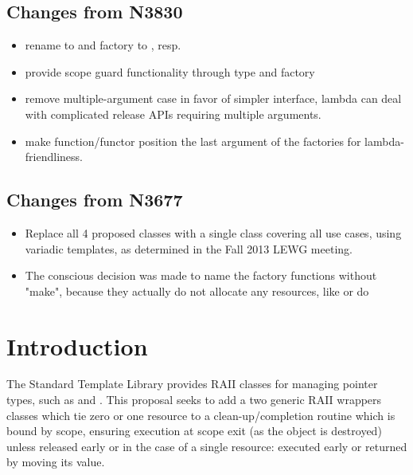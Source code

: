 \documentclass[ebook,11pt,article]{memoir}
\begin{document}
\section{Changes from N3830}
\begin{itemize}
\item rename to  and factory to , resp. 
\item provide scope guard functionality through type  and  factory
\item remove multiple-argument case in favor of simpler interface, lambda can deal with complicated release APIs requiring multiple arguments.
\item make function/functor position the last argument of the factories for lambda-friendliness.

\end{itemize}

\section{Changes from N3677}
\begin{itemize}
\item Replace all 4 proposed classes with a single class covering all use cases, using variadic templates, as determined in the Fall 2013 LEWG meeting.
\item The conscious decision was made to name the factory functions without "make", because they actually do not allocate any resources, like  or  do
\end{itemize}

\chapter{Introduction}
The Standard Template Library provides RAII classes for managing pointer types, such as  and .  This proposal seeks to add a two generic RAII wrappers classes which tie zero or one resource to a clean-up/completion routine which is bound by scope, ensuring execution at scope exit (as the object is destroyed) unless released early or in the case of a single resource: executed early or returned by moving its value.
\end{document}
